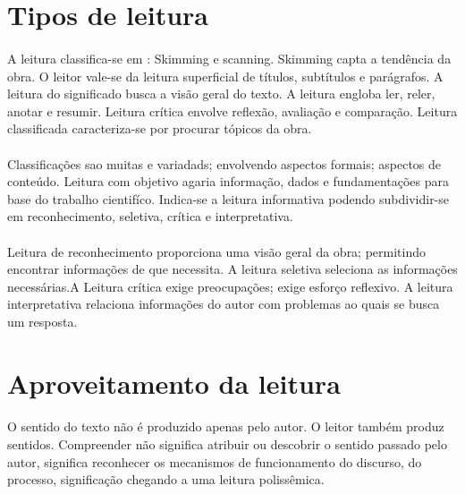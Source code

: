 \section{Tipos de leitura}

\paragraph{}
A leitura classifica-se em : Skimming e scanning. Skimming capta a tendência da obra. O leitor vale-se da leitura superficial de títulos, subtítulos e parágrafos. A leitura do significado busca a visão geral do texto. A leitura engloba ler, reler, anotar e resumir. Leitura crítica envolve reflexão, avaliação e comparação. Leitura classificada caracteriza-se por procurar tópicos da obra.

\paragraph{}
Classificações sao muitas  e variadads; envolvendo aspectos formais; aspectos de conteúdo. Leitura com objetivo agaria informação, dados e fundamentações para base do trabalho cientifíco. Indica-se a leitura informativa podendo subdividir-se em reconhecimento, seletiva, crítica e interpretativa.

\paragraph{}
Leitura de reconhecimento proporciona uma visão geral da obra; permitindo encontrar informações de que necessita. A leitura seletiva seleciona as informações necessárias.A Leitura crítica exige preocupações; exige esforço reflexivo. A leitura interpretativa relaciona informações do autor com problemas ao quais se busca um resposta.

\section{Aproveitamento da leitura}

\paragraph{}
O sentido do texto não é produzido apenas pelo autor. O leitor também produz sentidos. Compreender não significa atribuir ou descobrir o sentido passado pelo autor, significa reconhecer os mecanismos de funcionamento do discurso, do processo, significação chegando a uma leitura polissêmica.

